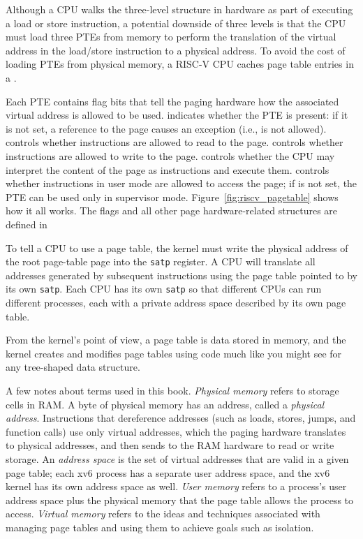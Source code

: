 Although a CPU walks the three-level structure in hardware as part of
executing a load or store instruction, a potential downside of three
levels is that the CPU must load three PTEs from memory to perform the
translation of the virtual address in the load/store instruction to a
physical address.  To avoid the cost of loading PTEs from physical
memory, a RISC-V CPU caches page table entries in a
.

Each PTE contains flag bits that tell the paging hardware
how the associated virtual address is allowed to be used.
indicates whether the PTE is present: if it is
not set, a reference to the page causes an exception (i.e., is not allowed).
controls whether instructions are allowed to 
read to the page.
controls whether instructions are allowed to 
write to the page.
controls whether the CPU may interpret the content
of the page as instructions and execute them.
controls whether instructions in user mode are allowed
to access the page;
if  is not set, the PTE can be used only in supervisor mode.
Figure~\ref{fig:riscv_pagetable}
shows how it all works.
The flags and all other page hardware-related structures are defined in

To tell a CPU to use a page table, the kernel must
write the physical address of the root page-table page into the 
\texttt{satp} register.
A CPU will translate all addresses generated by subsequent instructions
using the page table pointed to by its own \texttt{satp}.
Each CPU has its own \texttt{satp} so that different CPUs can run
different processes, each with a private address space described by
its own page table.

From the kernel's point of view, a page table is data stored in
memory, and the kernel creates and modifies page tables using code
much like you might see for any tree-shaped data structure.

A few notes about terms used in this book. \textit{Physical memory}
refers to storage cells in RAM. A byte of physical memory has an
address, called a \textit{physical address}. Instructions that
dereference addresses (such as loads, stores, jumps, and function calls)
use only
virtual addresses, which the paging hardware translates to physical
addresses, and then sends to the RAM hardware to read or write
storage. An \textit{address space} is the set of virtual addresses
that are valid in a given page table; each xv6 process has a separate
user address space, and the xv6 kernel has its own address space as
well. \textit{User memory} refers to a process's user address space
plus the physical memory that the page table allows the process to
access. \textit{Virtual memory} refers to the ideas and techniques
associated with managing page tables and using them to achieve goals
such as isolation.

